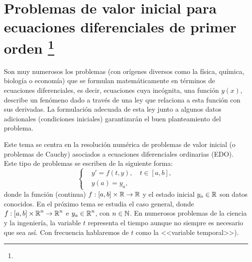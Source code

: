 %
%
\renewcommand{\tt}{t}
\newcommand{\yy}{y}
\newcommand{\yn}{{\yy_n}}
\newcommand{\ynn}{{\yy_{n+1}}}
\newcommand{\ta}{a}
\newcommand{\tb}{b}
\newcommand{\tn}{{\tt_n}}
\newcommand{\tnn}{{\tt_{n+1}}}
\newcommand{\zn}{{z_n}}
\newcommand{\znn}{{z_{n+1}}}
\newcommand{\ycero}{{y_a}}
\newcommand{\sol}{y}
\newcommand{\lipschitz}{$y$--Lipschitz\xspace}
\newcommand{\locLipschitz}{localmente \lipschitz}
\newcommand{\globLipschitz}{\lipschitz}
\newcommand{\errCons}{{\cal E}}
\newcommand{\RK}{Runge--Kutta\xspace}
\newcommand{\AB}{Adams--Bashforth\xspace}
\newcommand{\AM}{Adams--Moulton\xspace}

\chapter[Problemas de valor inicial para EDO de orden 1]
{Problemas de valor inicial para ecuaciones diferenciales de primer
  orden%
  \footnote{\licenseInfo}}

Son muy numerosos los problemas (con orígenes diversos como la física,
química, biología o economía) que se formulan matemáticamente en
términos de ecuaciones diferenciales, es decir, ecuaciones cuya
incógnita, una función $y(x)$, describe un fenómeno dado a través de
una ley que relaciona a esta función con sus derivadas. La formulación
adecuada de esta ley junto a algunos datos adicionales (condiciones
iniciales) garantizarán el buen planteamiento del problema.

Este tema se centra en la resolución numérica de problemas de valor
inicial (o problemas de Cauchy) asociados a ecuaciones diferenciales
ordinarias (EDO). Este tipo de problemas se escriben de la siguiente
forma:
\begin{equation}
  \label{eq:pvi}
  \tag{PVI}
  \left\{
  \begin{aligned}
    &y' = f(\tt,\yy), \quad \tt\in[\ta,\tb],
    \\
    &y(\ta) = \ycero,
  \end{aligned}
  \right.
\end{equation}
donde la función (continua) $f:[\ta,\tb]\times\Rset\to\Rset$ y el
estado inicial $\ycero\in\Rset$ son datos conocidos. En el próximo
tema se estudia el caso general, donde
$f:[\ta,\tb]\times\Rset^n\to\Rset^n$ e $\ycero\in\Rset^n$, con
$n\in\operatorname{{\mathbb N}}$. En numerosos problemas de la ciencia y la ingeniería, la
variable $\tt$ representa el tiempo aunque no siempre es necesario que
sea así. Con frecuencia hablaremos de $\tt$ como la <<variable
temporal>>).


